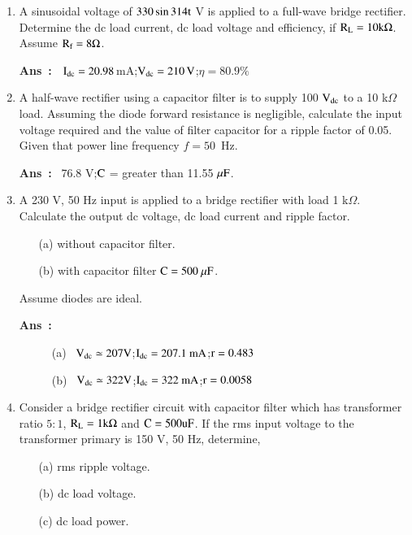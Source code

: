 \begin{enumerate}
\item A sinusoidal voltage of $330\sin 314\textrm{t}$ V is applied to a full-wave bridge rectifier. Determine the dc load current, dc load voltage and efficiency, if $\textrm{R}_{\textrm{L}}=10\textrm{k}\Omega$. Assume $\textrm{R}_{\textrm{f}}=8\Omega$.

\smallskip
\noindent
{\bf Ans~:~} $\textrm{I}_{\text{dc}}=20.98$\,mA;\quad $\textrm{V}_{\text{dc}}=210\,\textrm{V}$;\quad $\eta=80.9\%$

\item A half-wave rectifier using a capacitor filter is to supply 100 $\textrm{V}_{\text{dc}}$ to a 10 k$\Omega$ load. Assuming the diode forward resistance is negligible, calculate the input voltage required and the value of filter capacitor for a ripple factor of 0.05. Given that power line frequency $f=50$~Hz.

\smallskip
\noindent
{\bf Ans~:}~ 76.8 V;\quad $\textrm{C}$ = greater than 11.55 $\mu\textrm{F}$.

\item A 230 V, 50 Hz input is applied to a bridge rectifier with load 1 k$\Omega$. Calculate the output dc voltage, dc load current and ripple factor.
\begin{itemize}
\item[(a)] without capacitor filter.

\item[(b)] with capacitor filter $\textrm{C}=500~\mu\textrm{F}$. 
\end{itemize}
Assume diodes are ideal.
\begin{description}
\item[{\bf Ans~:}] (a)~ $\textrm{V}_{\text{dc}}\simeq 207\textrm{V}$;\quad $\textrm{I}_{\text{dc}}=207.1~\text{mA}$;\quad $\textrm{r}=0.483$

(b)~ $\textrm{V}_{\text{dc}}\simeq 322\textrm{V}$;\quad $\textrm{I}_{\text{dc}}=322~\text{mA}$;\quad $\textrm{r}=0.0058$ 
\end{description}

\item Consider a bridge rectifier circuit with capacitor filter which has transformer ratio $5:1$, $\textrm{R}_{\textrm{L}}=1\textrm{k}\Omega$ and $\textrm{C}=500\textrm{u}\textrm{F}$. If the rms input voltage to the transformer primary is 150 V, 50 Hz, determine,
\begin{itemize}
\item[(a)] rms ripple voltage.

\item[(b)] dc load voltage.

\item[(c)] dc load power.
\end{itemize}


\end{enumerate}
